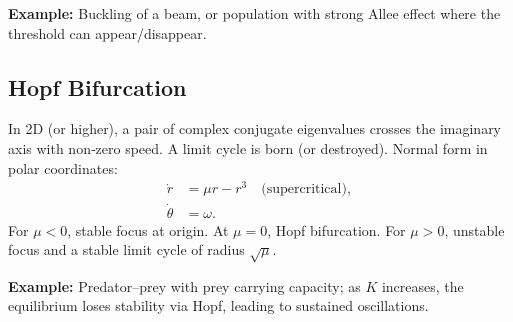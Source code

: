 \documentclass[12pt,a4paper]{book}
\begin{document}
\textbf{Example:} Buckling of a beam, or population with strong Allee effect where the threshold can appear/disappear.

\subsection{Hopf Bifurcation}
In 2D (or higher), a pair of complex conjugate eigenvalues crosses the imaginary axis with non‑zero speed. A limit cycle is born (or destroyed). Normal form in polar coordinates:
\begin{align*}
\dot{r} &= \mu r - r^3 \quad \text{(supercritical)},\\
\dot{\theta} &= \omega.
\end{align*}
For $\mu<0$, stable focus at origin. At $\mu=0$, Hopf bifurcation. For $\mu>0$, unstable focus and a stable limit cycle of radius $\sqrt{\mu}$.

\textbf{Example:} Predator–prey with prey carrying capacity; as $K$ increases, the equilibrium loses stability via Hopf, leading to sustained oscillations.
\end{document}
